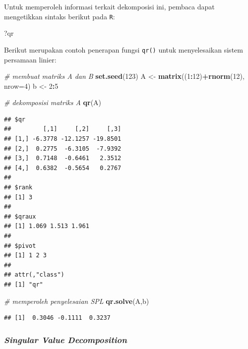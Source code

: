 \documentclass[
]{book}
\newenvironment{Shaded}{\begin{snugshade}}{\end{snugshade}}
\newcommand{\AttributeTok}[1]{\textcolor[rgb]{0.13,0.29,0.53}{#1}}
\newcommand{\CommentTok}[1]{\textcolor[rgb]{0.56,0.35,0.01}{\textit{#1}}}
\newcommand{\DecValTok}[1]{\textcolor[rgb]{0.00,0.00,0.81}{#1}}
\newcommand{\FunctionTok}[1]{\textcolor[rgb]{0.13,0.29,0.53}{\textbf{#1}}}
\newcommand{\NormalTok}[1]{#1}
\newcommand{\OtherTok}[1]{\textcolor[rgb]{0.56,0.35,0.01}{#1}}
\newcommand{\SpecialCharTok}[1]{\textcolor[rgb]{0.81,0.36,0.00}{\textbf{#1}}}
\theoremstyle{definition}
\theoremstyle{definition}
\theoremstyle{definition}
\theoremstyle{definition}
\theoremstyle{remark}
\begin{document}
Untuk memperoleh informasi terkait dekomposisi ini, pembaca dapat mengetikkan sintaks berikut pada \texttt{R}:

\begin{Shaded}
\begin{Highlighting}[]
\NormalTok{?qr}
\end{Highlighting}
\end{Shaded}

Berikut merupakan contoh penerapan fungsi \texttt{qr()} untuk menyelesaikan sistem persamaan linier:

\begin{Shaded}
\begin{Highlighting}[]
\CommentTok{\# membuat matriks A dan B}
\FunctionTok{set.seed}\NormalTok{(}\DecValTok{123}\NormalTok{)}
\NormalTok{A }\OtherTok{\textless{}{-}} \FunctionTok{matrix}\NormalTok{((}\DecValTok{1}\SpecialCharTok{:}\DecValTok{12}\NormalTok{)}\SpecialCharTok{+}\FunctionTok{rnorm}\NormalTok{(}\DecValTok{12}\NormalTok{), }\AttributeTok{nrow=}\DecValTok{4}\NormalTok{)}
\NormalTok{b }\OtherTok{\textless{}{-}} \DecValTok{2}\SpecialCharTok{:}\DecValTok{5}

\CommentTok{\# dekomposisi matriks A}
\FunctionTok{qr}\NormalTok{(A)}
\end{Highlighting}
\end{Shaded}

\begin{verbatim}
## $qr
##         [,1]     [,2]     [,3]
## [1,] -6.3778 -12.1257 -19.8501
## [2,]  0.2775  -6.3105  -7.9392
## [3,]  0.7148  -0.6461   2.3512
## [4,]  0.6382  -0.5654   0.2767
## 
## $rank
## [1] 3
## 
## $qraux
## [1] 1.069 1.513 1.961
## 
## $pivot
## [1] 1 2 3
## 
## attr(,"class")
## [1] "qr"
\end{verbatim}

\begin{Shaded}
\begin{Highlighting}[]
\CommentTok{\# memperoleh penyelesaian SPL}
\FunctionTok{qr.solve}\NormalTok{(A,b)}
\end{Highlighting}
\end{Shaded}

\begin{verbatim}
## [1]  0.3046 -0.1111  0.3237
\end{verbatim}

\hypertarget{svddecomp}{%
\subsubsection{\texorpdfstring{\emph{Singular Value Decomposition}}{Singular Value Decomposition}}\label{svddecomp}}
\end{document}
